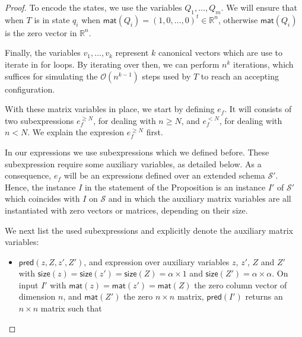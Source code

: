 \begin{proof}
To encode the states, we use the variables $Q_1,\ldots,Q_m$. We will ensure that when $T$ is in state $q_i$ when
 $\mathsf{mat}(Q_i)=(1,0,\ldots,0)^t\in\mathbb{R}^n$, otherwise $\mathsf{mat}(Q_i)$ is the zero vector in $\mathbb{R}^n$.	

Finally, the variables $v_1,\ldots,v_{k}$ represent $k$ canonical vectors  which are use to iterate in for loops. By iterating over then, we can perform $n^{k}$ iterations, which suffices for simulating the $\mathcal{O}(n^{k-1})$ steps used by $T$ to reach an accepting configuration. 

With these matrix variables in place, we start by defining $e_f$. It will consists of two subexpressions
$e_f^{\geq N}$, for dealing with $n\geq N$, and $e_f^{<N}$, for dealing with $n<N$. We explain the expresion
$e_f^{\geq N}$ first.



In our  expressions we use subexpressions which we defined before. These subexpression require some auxiliary variables, as detailed below. As a consequence, $e_f$ will be an expressions defined over an extended schema $\mathcal{S}'$. Hence, the instance $I$ in the statement of the Proposition is  an instance $I'$ of $\mathcal{S}'$ which
coincides with $I$ on $\mathcal{S}$ and in which the auxiliary matrix variables are all instantiated with zero vectors or matrices, depending on their size.

We next list the used subexpressions and explicitly denote the auxiliary matrix variables:
\begin{itemize}
	\item $\mathsf{pred}(z,Z,z',Z')$, and expression over auxiliary variables $z$, $z'$, $Z$ and $Z'$ with $\mathsf{size}(z)=\mathsf{size}(z')=\mathsf{size}(Z)=\alpha\times 1$ and $\mathsf{size}(Z')=\alpha\times\alpha$. On input $I'$ with 
	$\mathsf{mat}(z)=\mathsf{mat}(z')=\mathsf{mat}(Z)$ the zero column vector of dimension $n$, and $\mathsf{mat}(Z')$ the zero $n\times n$ matrix,
	 $\mathsf{pred}(I')$ returns an $n\times n$ matrix such that 
	 

\end{itemize}
\end{proof}
